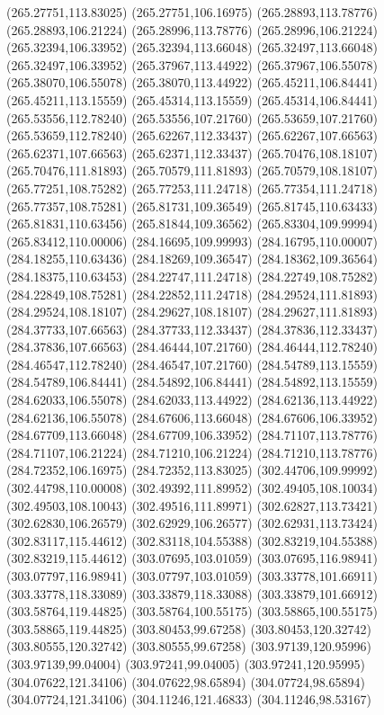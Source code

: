 {(265.27751,113.83025) (265.27751,106.16975) (265.28893,113.78776) (265.28893,106.21224) (265.28996,113.78776) (265.28996,106.21224) (265.32394,106.33952) (265.32394,113.66048)
(265.32497,113.66048) (265.32497,106.33952) (265.37967,113.44922) (265.37967,106.55078) (265.38070,106.55078) (265.38070,113.44922) (265.45211,106.84441) (265.45211,113.15559)
(265.45314,113.15559) (265.45314,106.84441) (265.53556,112.78240) (265.53556,107.21760) (265.53659,107.21760) (265.53659,112.78240) (265.62267,112.33437) (265.62267,107.66563)
(265.62371,107.66563) (265.62371,112.33437) (265.70476,108.18107) (265.70476,111.81893) (265.70579,111.81893) (265.70579,108.18107) (265.77251,108.75282) (265.77253,111.24718)
(265.77354,111.24718) (265.77357,108.75281) (265.81731,109.36549) (265.81745,110.63433) (265.81831,110.63456) (265.81844,109.36562) (265.83304,109.99994) (265.83412,110.00006)
(284.16695,109.99993) (284.16795,110.00007) (284.18255,110.63436) (284.18269,109.36547) (284.18362,109.36564) (284.18375,110.63453) (284.22747,111.24718) (284.22749,108.75282)
(284.22849,108.75281) (284.22852,111.24718) (284.29524,111.81893) (284.29524,108.18107) (284.29627,108.18107) (284.29627,111.81893) (284.37733,107.66563) (284.37733,112.33437)
(284.37836,112.33437) (284.37836,107.66563) (284.46444,107.21760) (284.46444,112.78240) (284.46547,112.78240) (284.46547,107.21760) (284.54789,113.15559) (284.54789,106.84441)
(284.54892,106.84441) (284.54892,113.15559) (284.62033,106.55078) (284.62033,113.44922) (284.62136,113.44922) (284.62136,106.55078) (284.67606,113.66048) (284.67606,106.33952)
(284.67709,113.66048) (284.67709,106.33952) (284.71107,113.78776) (284.71107,106.21224) (284.71210,106.21224) (284.71210,113.78776) (284.72352,106.16975) (284.72352,113.83025)
(302.44706,109.99992) (302.44798,110.00008) (302.49392,111.89952) (302.49405,108.10034) (302.49503,108.10043) (302.49516,111.89971) (302.62827,113.73421) (302.62830,106.26579)
(302.62929,106.26577) (302.62931,113.73424) (302.83117,115.44612) (302.83118,104.55388) (302.83219,104.55388) (302.83219,115.44612) (303.07695,103.01059) (303.07695,116.98941)
(303.07797,116.98941) (303.07797,103.01059) (303.33778,101.66911) (303.33778,118.33089) (303.33879,118.33088) (303.33879,101.66912) (303.58764,119.44825) (303.58764,100.55175)
(303.58865,100.55175) (303.58865,119.44825) (303.80453,99.67258) (303.80453,120.32742) (303.80555,120.32742) (303.80555,99.67258) (303.97139,120.95996) (303.97139,99.04004)
(303.97241,99.04005) (303.97241,120.95995) (304.07622,121.34106) (304.07622,98.65894) (304.07724,98.65894) (304.07724,121.34106) (304.11246,121.46833) (304.11246,98.53167)
}
